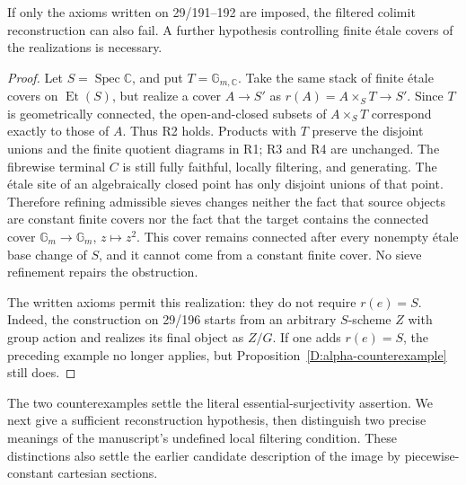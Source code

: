 \begin{proposition}
\label{D:alpha-geometric-counterexample}
If only the axioms written on 29/191--192 are imposed, the filtered
colimit reconstruction can also fail. A further hypothesis controlling
finite \'etale covers of the realizations is necessary.
\end{proposition}
\begin{proof}
Let $S=\operatorname{Spec}\mathbb C$, and put
$T=\mathbb G_{m,\mathbb C}$. Take the same stack of finite \'etale
covers on $\operatorname{Et}(S)$, but realize a cover $A\to S'$
as $r(A)=A\times_ST\to S'$. Since $T$ is geometrically connected,
the open-and-closed subsets of $A\times_ST$ correspond exactly to
those of $A$. Thus R2 holds. Products with $T$ preserve the disjoint
unions and the finite quotient diagrams in R1; R3 and R4 are unchanged.
The fibrewise terminal $C$ is still fully faithful, locally filtering,
and generating. The \'etale site of an algebraically closed point has
only disjoint unions of that point. Therefore refining admissible
sieves changes neither the fact that source objects are constant finite
covers nor the fact that the target contains the connected cover
$\mathbb G_m\to\mathbb G_m$, $z\mapsto z^2$.
This cover remains connected after every nonempty \'etale base change
of $S$, and it cannot come from a constant finite cover. No sieve
refinement repairs the obstruction.

The written axioms permit this realization: they do not require
$r(e)=S$. Indeed, the construction on 29/196 starts from an arbitrary
$S$-scheme $Z$ with group action and realizes its final object as
$Z/G$. If one adds $r(e)=S$, the preceding example no longer applies,
but Proposition~\ref{D:alpha-counterexample} still does.
\end{proof}

The two counterexamples settle the literal essential-surjectivity assertion.
We next give a sufficient reconstruction hypothesis, then distinguish
two precise meanings of the manuscript's undefined local filtering
condition. These distinctions also settle the earlier candidate
description of the image by piecewise-constant cartesian sections.

